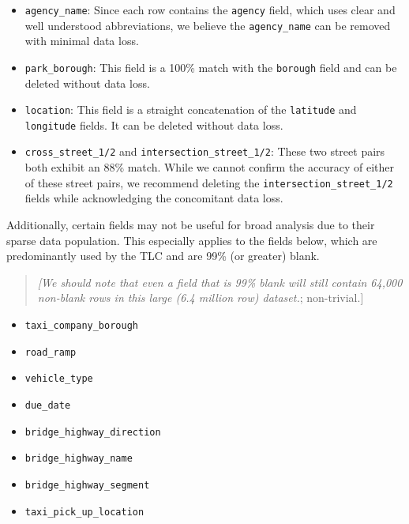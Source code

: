 \documentclass[linenumber]{jdsart}
\begin{document}
\begin{itemize}[left=1.5em]
    \item \texttt{agency\_name}: Since each row contains the \texttt{agency} 
    field, which uses clear and well understood abbreviations, we believe the
    \texttt{agency\_name} can be removed with minimal data loss.
    
    \item \texttt{park\_borough}: This field is a 100\% match with 
    the \texttt{borough} field and can be deleted without data loss.
    
    \item \texttt{location}: This field is a straight concatenation of 
    the \texttt{latitude} and \texttt{longitude} fields. It can be 
    deleted without data loss.
     
    \item \texttt{cross\_street\_1/2} and \texttt{intersection\_street\_1/2}: 
    These two street pairs both exhibit an 88\% match. While we cannot 
    confirm the accuracy of either of these street pairs, we recommend deleting the 
    \texttt{intersection\_street\_1/2} fields while acknowledging 
    the concomitant data loss.
\end{itemize}

Additionally, certain fields may not be useful for broad analysis
due to their sparse data population. This especially applies to the fields below, 
which are predominantly used by the TLC and are 99\% (or greater) blank.

\begin{quote}
\textit{[We should note that even a field that is 99\% 
blank will still contain 64,000 non-blank rows in this 
large (6.4 million row) dataset.}; non-trivial.]
\end{quote}

\begin{itemize}[left=1.5em]
    \item \texttt{taxi\_company\_borough}
    \item \texttt{road\_ramp}
    \item \texttt{vehicle\_type}
    \item \texttt{due\_date}
    \item \texttt{bridge\_highway\_direction}
    \item \texttt{bridge\_highway\_name}
    \item \texttt{bridge\_highway\_segment}
    \item \texttt{taxi\_pick\_up\_location}
\end{itemize}
\end{document}
